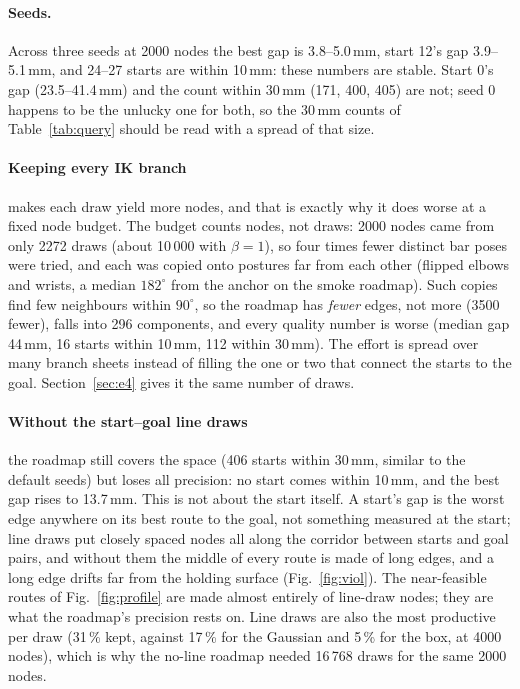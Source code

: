 \begin{table}[h]
\centering
\footnotesize
\setlength{\tabcolsep}{3.5pt}
\caption{The 2000-node B18 roadmap under three seeds and two sampler changes, one
column per roadmap; rows as in Tables~\ref{tab:build} and~\ref{tab:query}.}
\label{tab:ablation}

\end{table}

\paragraph{Seeds.} Across three seeds at 2000 nodes the best gap is 3.8--5.0\,mm,
start 12's gap 3.9--5.1\,mm, and 24--27 starts are within 10\,mm: these numbers
are stable. Start 0's gap (23.5--41.4\,mm) and the count within 30\,mm (171,
400, 405) are not; seed 0 happens to be the unlucky one for both, so the 30\,mm
counts of Table~\ref{tab:query} should be read with a spread of that size.

\paragraph{Keeping every IK branch} makes each draw yield more nodes, and that
is exactly why it does worse at a fixed node budget. The budget counts nodes,
not draws: 2000 nodes came from only 2272 draws (about 10\,000 with
$\beta = 1$), so four times fewer distinct bar poses were tried, and each was
copied onto postures far from each other (flipped elbows and wrists, a median
$182^\circ$ from the anchor on the smoke roadmap). Such copies find few
neighbours within $90^\circ$, so the roadmap has \emph{fewer} edges, not more
(3500 fewer), falls into 296 components, and every quality number is worse
(median gap 44\,mm, 16 starts within 10\,mm, 112 within 30\,mm). The effort is
spread over many branch sheets instead of filling the one or two that connect
the starts to the goal. Section~\ref{sec:e4} gives it the same number of draws.

\paragraph{Without the start--goal line draws} the roadmap still covers the
space (406 starts within 30\,mm, similar to the default seeds) but loses all
precision: no start comes within 10\,mm, and the best gap rises to 13.7\,mm.
This is not about the start itself. A start's gap is the worst edge anywhere
on its best route to the goal, not something measured at the start; line
draws put closely spaced nodes all along the corridor between starts and goal
pairs, and without them the middle of every route is made of long edges, and a
long edge drifts far from the holding surface (Fig.~\ref{fig:viol}). The
near-feasible routes of Fig.~\ref{fig:profile} are made almost entirely of
line-draw nodes; they are what the roadmap's precision rests on. Line draws are
also the most productive per draw (31\,\% kept, against 17\,\% for the Gaussian
and 5\,\% for the box, at 4000 nodes), which is why the no-line roadmap needed
16\,768 draws for the same 2000 nodes.

